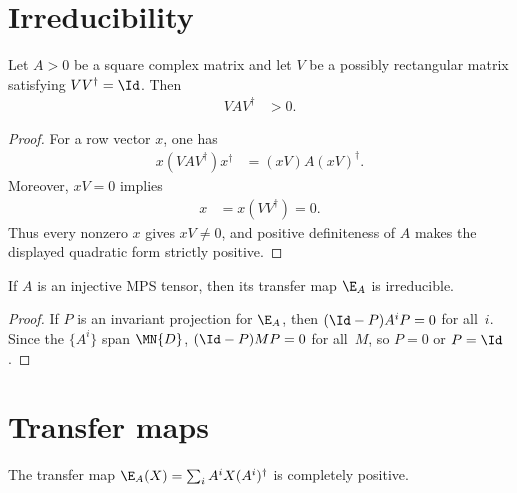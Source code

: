 \section{Irreducibility}


\begin{theorem}
    \label{thm:matrix_posdef_coisometric_transport}
    \leanok
    Let $A>0$ be a square complex matrix and let $V$ be a possibly rectangular
    matrix satisfying $VV^\dagger=\Id$. Then
    \begin{align}
        VAV^\dagger & >0.
    \end{align}
\end{theorem}

\begin{proof}\leanok
    For a row vector $x$, one has
    \begin{align}
        x(VAV^\dagger)x^\dagger & =(xV)A(xV)^\dagger.
    \end{align}
    Moreover, $xV=0$ implies
    \begin{align}
        x & =x(VV^\dagger)=0.
    \end{align}
    Thus every nonzero $x$ gives $xV\ne0$, and positive definiteness of $A$
    makes the displayed quadratic form strictly positive.
\end{proof}


\begin{theorem}\label{thm:injective_irreducible}
    \leanok
    If $A$ is an injective MPS tensor, then its transfer map $\E_A$
    is irreducible.
\end{theorem}

\begin{proof}
    \leanok
    If $P$ is an invariant projection for $\E_A$, then
    $(\Id-P)A^iP=0$ for all~$i$. Since the $\{A^i\}$ span $\MN{D}$,
    $(\Id-P)MP=0$ for all~$M$, so $P=0$ or $P=\Id$.
\end{proof}

\section{Transfer maps}

\begin{theorem}\label{thm:transfer_cp}
    \leanok
    The transfer map $\E_A(X)=\sum_i A^iX(A^i)^\dagger$
    is completely positive.
\end{theorem}

